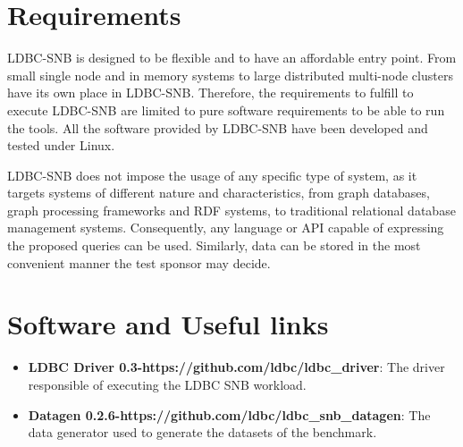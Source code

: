 

\section{Requirements}

LDBC-SNB is designed to be flexible and to have an affordable entry point.
From small single node and in memory systems to large distributed multi-node
clusters have its own place in LDBC-SNB.  Therefore, the requirements to
fulfill to execute LDBC-SNB are limited to pure software requirements to be
able to run the tools. All the software provided by LDBC-SNB have been
developed and tested under Linux.

LDBC-SNB does not impose the usage of any specific type of system, as it
targets systems of different nature and characteristics, from graph databases,
graph processing frameworks and RDF systems, to traditional relational database
management systems. Consequently, any language or API capable of expressing the
proposed queries can be used. Similarly, data can be stored in the most
convenient manner the test sponsor may decide.


\section{Software and Useful links} 

\begin{itemize}
    \item \textbf{LDBC Driver 0.3-https://github.com/ldbc/ldbc\_driver}: The driver
    responsible of executing the LDBC SNB workload.
    \item \textbf{Datagen 0.2.6-https://github.com/ldbc/ldbc\_snb\_datagen}: The data
    generator used to generate the datasets of the benchmark.
\end{itemize}


%
%
%
%




